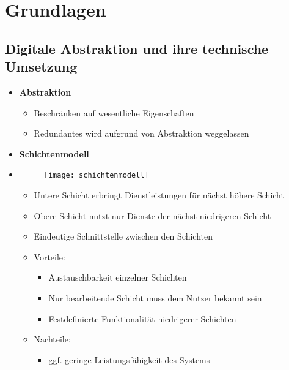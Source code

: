\section{Grundlagen}
\subsection{Digitale Abstraktion und ihre technische Umsetzung}
\begin{itemize}

\item \textbf{Abstraktion}
	\begin{itemize}
	\item Beschränken auf wesentliche Eigenschaften
	\item Redundantes wird aufgrund von Abstraktion weggelassen
	\end{itemize}

\item \textbf{Schichtenmodell}
\item[] 
	\begin{minipage}{0.225\textwidth}
		\begin{figure}[H]
		\texttt{[image: schichtenmodell]}
		\end{figure}
	\end{minipage}
	\begin{minipage}[t]{0.7\textwidth}
		\vspace{-3.5cm}
		\begin{itemize}
		\item Untere Schicht erbringt Dienstleistungen für nächst höhere Schicht
		\item Obere Schicht nutzt nur Dienste der nächst niedrigeren Schicht
		\item Eindeutige Schnittstelle zwischen den Schichten
		\item Vorteile: 
			\begin{itemize}
			\item Austauschbarkeit einzelner Schichten
			\item Nur bearbeitende Schicht muss dem Nutzer bekannt sein
			\item Festdefinierte Funktionalität niedrigerer Schichten
			\end{itemize}
		\item Nachteile:
			\begin{itemize}
			\item ggf. geringe Leistungsfähigkeit des Systems
			\end{itemize}
		\end{itemize}
	\end{minipage}


\end{itemize}
